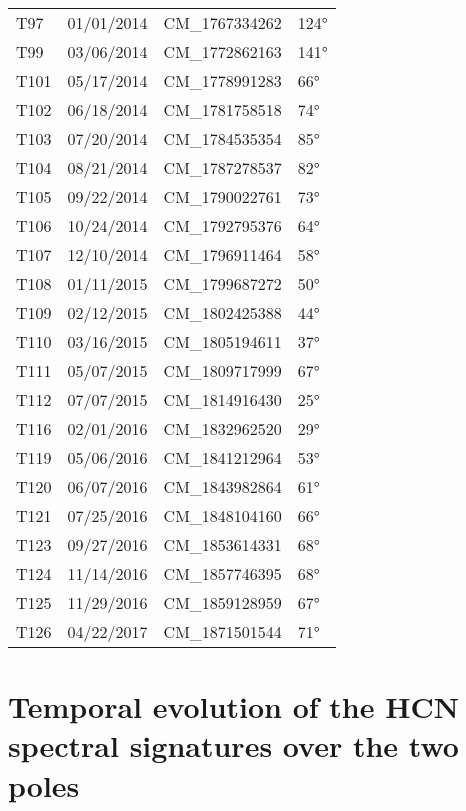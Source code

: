 \documentclass[preprint,twocolumn,5p,authoryear,compress,colorlinks=true]{elsarticle}
\begin{document}
{\begin{table}[!ht]
\begin{tabular}{l l l l}
    T97 & 01/01/2014 & CM\_1767334262   & \ang{124} \\
    T99 & 03/06/2014 & CM\_1772862163   & \ang{141} \\
    T101    & 05/17/2014 & CM\_1778991283   & \ang{66} \\
    T102    & 06/18/2014 & CM\_1781758518   & \ang{74} \\
    T103    & 07/20/2014 & CM\_1784535354   & \ang{85} \\
    T104    & 08/21/2014 & CM\_1787278537   & \ang{82} \\
    T105    & 09/22/2014 & CM\_1790022761   & \ang{73} \\
    T106    & 10/24/2014 & CM\_1792795376   & \ang{64} \\
    T107    & 12/10/2014 & CM\_1796911464   & \ang{58} \\
    T108    & 01/11/2015 & CM\_1799687272   & \ang{50} \\
    T109    & 02/12/2015 & CM\_1802425388   & \ang{44} \\
    T110    & 03/16/2015 & CM\_1805194611   & \ang{37} \\
    T111    & 05/07/2015 & CM\_1809717999   & \ang{67} \\
    T112    & 07/07/2015 & CM\_1814916430   & \ang{25} \\
    T116    & 02/01/2016 & CM\_1832962520   & \ang{29} \\
    T119    & 05/06/2016 & CM\_1841212964   & \ang{53} \\
    T120    & 06/07/2016 & CM\_1843982864   & \ang{61} \\
    T121    & 07/25/2016 & CM\_1848104160   & \ang{66} \\
    T123    & 09/27/2016 & CM\_1853614331   & \ang{68} \\
    T124    & 11/14/2016 & CM\_1857746395   & \ang{68} \\
    T125    & 11/29/2016 & CM\_1859128959   & \ang{67} \\
    T126    & 04/22/2017 & CM\_1871501544   & \ang{71} \\
    \bottomrule
    \end{tabular}
    \end{table}
    \clearpage
}

\section{Temporal evolution of the HCN spectral signatures over the two poles}
\end{document}
